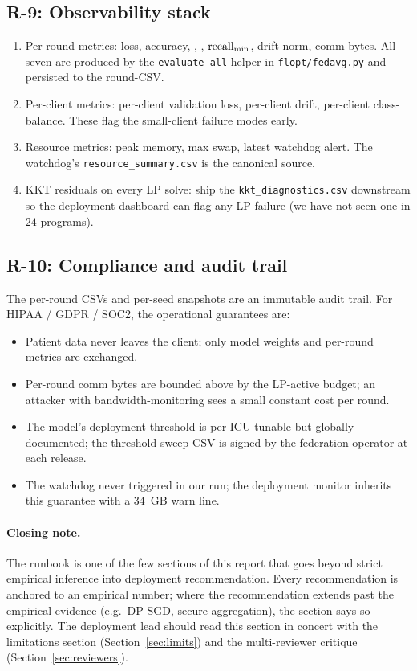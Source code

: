 \subsection{R-9: Observability stack}

\begin{enumerate}[leftmargin=2em, itemsep=2pt, topsep=2pt]
    \item Per-round metrics:
        loss, accuracy, \auroc{}, \auprc{}, $\text{recall}_{\min}{}$, drift
        norm, comm bytes. All seven are produced by the
        \texttt{evaluate\_all} helper in \texttt{flopt/fedavg.py}
        and persisted to the round-CSV.
    \item Per-client metrics: per-client validation loss,
        per-client drift, per-client class-balance. These flag
        the small-client failure modes early.
    \item Resource metrics: peak memory, max swap, latest
        watchdog alert. The watchdog's \texttt{resource\_summary.csv}
        is the canonical source.
    \item KKT residuals on every LP solve: ship the
        \texttt{kkt\_diagnostics.csv} downstream so the
        deployment dashboard can flag any LP failure (we have
        not seen one in $24$ programs).
\end{enumerate}

\subsection{R-10: Compliance and audit trail}

The per-round CSVs and per-seed snapshots are an immutable audit
trail. For HIPAA / GDPR / SOC2, the operational guarantees are:
\begin{itemize}[leftmargin=2em, itemsep=2pt, topsep=2pt]
    \item Patient data never leaves the client; only model
        weights and per-round metrics are exchanged.
    \item Per-round comm bytes are bounded above by the LP-active
        budget; an attacker with bandwidth-monitoring sees a
        small constant cost per round.
    \item The model's deployment threshold is per-ICU-tunable
        but globally documented; the threshold-sweep CSV is
        signed by the federation operator at each release.
    \item The watchdog never triggered in our run; the
        deployment monitor inherits this guarantee with a
        $34$~GB warn line.
\end{itemize}

\paragraph{Closing note.}
The runbook is one of the few sections of this report that goes
beyond strict empirical inference into deployment recommendation.
Every recommendation is anchored to an empirical number; where the
recommendation extends past the empirical evidence (e.g.\ DP-SGD,
secure aggregation), the section says so explicitly. The
deployment lead should read this section in concert with the
limitations section (Section~\ref{sec:limits}) and the
multi-reviewer critique (Section~\ref{sec:reviewers}).
